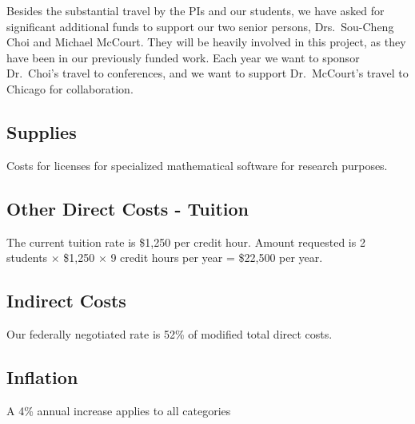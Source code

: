 \documentclass[11pt]{NSFamsart}
\begin{document}
Besides the substantial travel by the PIs and our students, we have asked for significant additional funds to support our two senior persons, Drs.\ Sou-Cheng Choi and Michael McCourt.  They will be heavily involved in this project, as they have been in our previously funded work.  Each year we want to sponsor Dr.\ Choi's travel to conferences, and we want to support Dr.\ McCourt's travel to Chicago for collaboration.

\subsection*{Supplies}
Costs for licenses for specialized mathematical software for research purposes.

\subsection*{Other Direct Costs - Tuition}
The current tuition rate is \$1,250 per credit hour. Amount requested is 2 students $\times$
\$1,250 $\times$ 9 credit hours per year = \$22,500 per year.

\subsection*{Indirect Costs}
Our federally negotiated rate is 52\% of modified total direct costs.

\subsection*{Inflation}A 4\% annual increase applies to all categories
\end{document}
